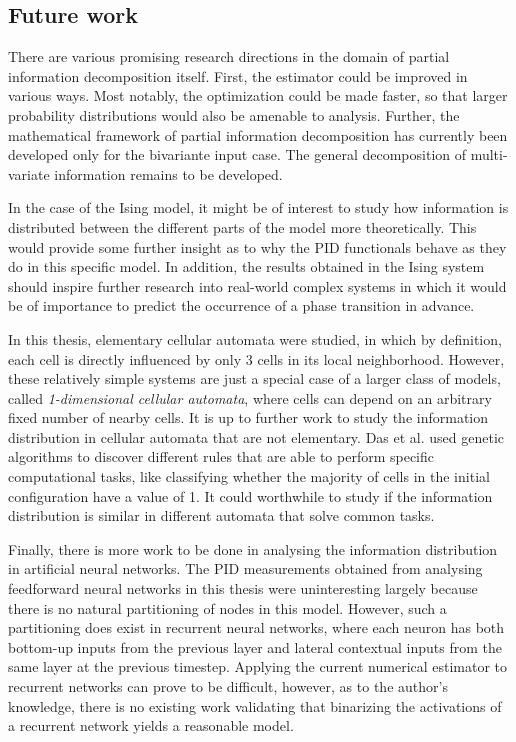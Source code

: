 \documentclass[12pt]{article}
\begin{document}
\subsection{Future work}

There are various promising research directions in the domain of partial information decomposition itself. First, the estimator could be improved in various ways. Most notably, the optimization could be made faster, so that larger probability distributions would also be amenable to analysis. Further, the mathematical framework of partial information decomposition has currently been developed only for the bivariante input case. The general decomposition of multi-variate information remains to be developed. 

In the case of the Ising model, it might be of interest to study how information is distributed between the different parts of the model more theoretically. This would provide some further insight as to why the PID functionals behave as they do in this specific model. In addition, the results obtained in the Ising system should inspire further research into real-world complex systems in which it would be of importance to predict the occurrence of a phase transition in advance. 

In this thesis, elementary cellular automata were studied, in which by definition, each cell is directly influenced by only 3 cells in its local neighborhood. However, these relatively simple systems are just a special case of a larger class of models, called \textit{1-dimensional cellular automata}, where cells can depend on an arbitrary fixed number of nearby cells. It is up to further work to study the information distribution in cellular automata that are not elementary. Das et al. \cite{Das1994} used genetic algorithms to discover different rules that are able to perform specific computational tasks, like classifying whether the majority of cells in the initial configuration have a value of 1. It could worthwhile to study if the information distribution is similar in different automata that solve common tasks. 

Finally, there is more work to be done in analysing the information distribution in artificial neural networks. The PID measurements obtained from analysing feedforward neural networks in this thesis were uninteresting largely because there is no natural partitioning of nodes in this model. However, such a partitioning does exist in recurrent neural networks, where each neuron has both bottom-up inputs from the previous layer and lateral contextual inputs from the same layer at the previous timestep. Applying the current numerical estimator to recurrent networks can prove to be difficult, however, as to the author's knowledge, there is no existing work validating that binarizing the activations of a recurrent network yields a reasonable model. 
\end{document}
